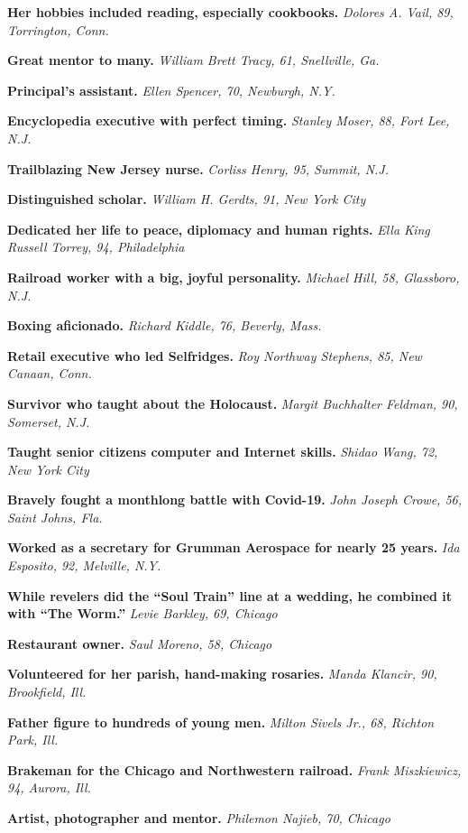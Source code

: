 \textbf{Her hobbies included reading, especially cookbooks.}
\emph{Dolores A. Vail, 89, Torrington, Conn.}

\textbf{Great mentor to many.} \emph{William Brett Tracy, 61,
Snellville, Ga.}

\textbf{Principal's assistant.} \emph{Ellen Spencer, 70, Newburgh, N.Y.}

\textbf{Encyclopedia executive with perfect timing.} \emph{Stanley
Moser, 88, Fort Lee, N.J.}

\textbf{Trailblazing New Jersey nurse.} \emph{Corliss Henry, 95, Summit,
N.J.}

\textbf{Distinguished scholar.} \emph{William H. Gerdts, 91, New York
City}

\textbf{Dedicated her life to peace, diplomacy and human rights.}
\emph{Ella King Russell Torrey, 94, Philadelphia}

\textbf{Railroad worker with a big, joyful personality.} \emph{Michael
Hill, 58, Glassboro, N.J.}

\textbf{Boxing aficionado.} \emph{Richard Kiddle, 76, Beverly, Mass.}

\textbf{Retail executive who led Selfridges.} \emph{Roy Northway
Stephens, 85, New Canaan, Conn.}

\textbf{Survivor who taught about the Holocaust.} \emph{Margit
Buchhalter Feldman, 90, Somerset, N.J.}

\textbf{Taught senior citizens computer and Internet skills.}
\emph{Shidao Wang, 72, New York City}

\textbf{Bravely fought a monthlong battle with Covid-19.} \emph{John
Joseph Crowe, 56, Saint Johns, Fla.}

\textbf{Worked as a secretary for Grumman Aerospace for nearly 25
years.} \emph{Ida Esposito, 92, Melville, N.Y.}

\textbf{While revelers did the ``Soul Train'' line at a wedding, he
combined it with ``The Worm.''} \emph{Levie Barkley, 69, Chicago}

\textbf{Restaurant owner.} \emph{Saul Moreno, 58, Chicago}

\textbf{Volunteered for her parish, hand-making rosaries.} \emph{Manda
Klancir, 90, Brookfield, Ill.}

\textbf{Father figure to hundreds of young men.} \emph{Milton Sivels
Jr., 68, Richton Park, Ill.}

\textbf{Brakeman for the Chicago and Northwestern railroad.} \emph{Frank
Miszkiewicz, 94, Aurora, Ill.}

\textbf{Artist, photographer and mentor.} \emph{Philemon Najieb, 70,
Chicago}

